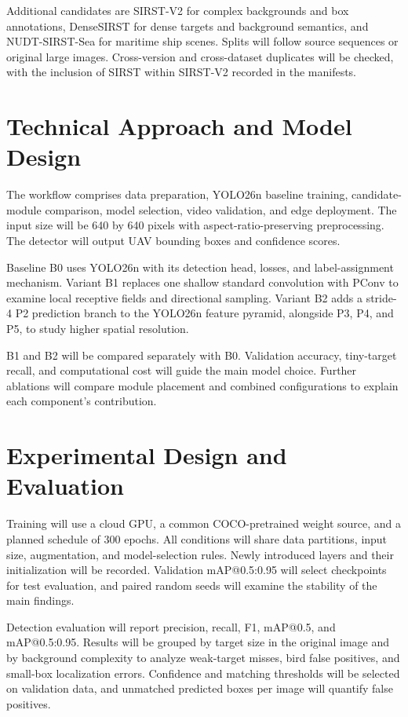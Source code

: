 Additional candidates are SIRST-V2 for complex backgrounds and box annotations, DenseSIRST for dense targets and background semantics, and NUDT-SIRST-Sea for maritime ship scenes\cite{dai2023oscar,xiao2025bafe,wu2023mtunet}. Splits will follow source sequences or original large images. Cross-version and cross-dataset duplicates will be checked, with the inclusion of SIRST within SIRST-V2 recorded in the manifests.

\section{Technical Approach and Model Design}
The workflow comprises data preparation, YOLO26n baseline training, candidate-module comparison, model selection, video validation, and edge deployment. The input size will be 640 by 640 pixels with aspect-ratio-preserving preprocessing. The detector will output UAV bounding boxes and confidence scores.

Baseline B0 uses YOLO26n with its detection head, losses, and label-assignment mechanism\cite{jocher2026yolo26,ultralytics2026docs}. Variant B1 replaces one shallow standard convolution with PConv to examine local receptive fields and directional sampling\cite{yang2025pconv}. Variant B2 adds a stride-4 P2 prediction branch to the YOLO26n feature pyramid, alongside P3, P4, and P5, to study higher spatial resolution.

B1 and B2 will be compared separately with B0. Validation accuracy, tiny-target recall, and computational cost will guide the main model choice. Further ablations will compare module placement and combined configurations to explain each component's contribution.

\section{Experimental Design and Evaluation}
Training will use a cloud GPU, a common COCO-pretrained weight source, and a planned schedule of 300 epochs. All conditions will share data partitions, input size, augmentation, and model-selection rules. Newly introduced layers and their initialization will be recorded. Validation mAP@0.5:0.95 will select checkpoints for test evaluation, and paired random seeds will examine the stability of the main findings.

Detection evaluation will report precision, recall, F1, mAP@0.5, and mAP@0.5:0.95. Results will be grouped by target size in the original image and by background complexity to analyze weak-target misses, bird false positives, and small-box localization errors. Confidence and matching thresholds will be selected on validation data, and unmatched predicted boxes per image will quantify false positives.

